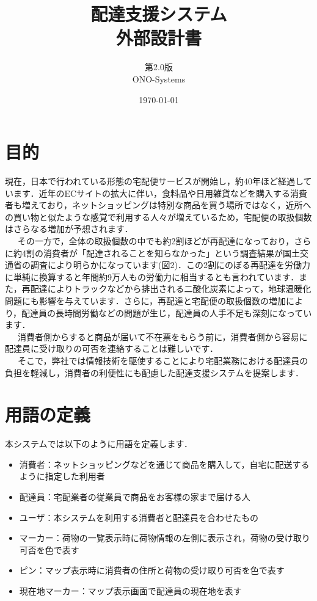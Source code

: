 \documentclass[a4j,titlepage]{jarticle}
\title{\huge 配達支援システム\\
		外部設計書}
\author{第2.0版\\
        ONO-Systems\\}
\date{\today}
\begin{document}
\maketitle

\tableofcontents
\clearpage

\section{目的}
現在，日本で行われている形態の宅配便サービスが開始し，約40年ほど経過しています．近年のECサイトの拡大に伴い，食料品や日用雑貨などを購入する消費者も増えており，ネットショッピングは特別な商品を買う場所ではなく，近所への買い物と似たような感覚で利用する人々が増えているため，宅配便の取扱個数はさらなる増加が予想されます\cite{ref1}．\\
\ \ \ その一方で，全体の取扱個数の中でも約2割ほどが再配達になっており，さらに約4割の消費者が「配達されることを知らなかった」という調査結果が国土交通省の調査により明らかになっています(図2)．この2割にのぼる再配達を労働力に単純に換算すると年間約9万人もの労働力に相当するとも言われています．また，再配達によりトラックなどから排出される二酸化炭素によって，地球温暖化問題にも影響を与えています．さらに，再配達と宅配便の取扱個数の増加により，配達員の長時間労働などの問題が生じ，配達員の人手不足も深刻になっています\cite{ref1}．\\
\ \ \ 消費者側からすると商品が届いて不在票をもらう前に，消費者側から容易に配達員に受け取りの可否を連絡することは難しいです．\\
\ \ \ そこで，弊社では情報技術を駆使することにより宅配業務における配達員の負担を軽減し，消費者の利便性にも配慮した配達支援システムを提案します．

\section{用語の定義}
本システムでは以下のように用語を定義します．
\begin{itemize}
 \item 消費者：ネットショッピングなどを通じて商品を購入して，自宅に配送するように指定した利用者
 \item 配達員：宅配業者の従業員で商品をお客様の家まで届ける人
 \item ユーザ：本システムを利用する消費者と配達員を合わせたもの
 \item マーカー：荷物の一覧表示時に荷物情報の左側に表示され，荷物の受け取り可否を色で表す
 \item ピン：マップ表示時に消費者の住所と荷物の受け取り可否を色で表す
 \item 現在地マーカー：マップ表示画面で配達員の現在地を表す
\end{itemize}
\end{document}
